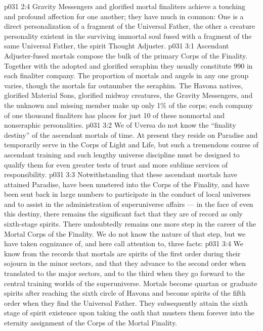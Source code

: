\vs p031 2:4 Gravity Messengers and glorified mortal finaliters achieve a touching and profound affection for one another; they have much in common: One is a direct personalization of a fragment of the Universal Father, the other a creature personality existent in the surviving immortal soul fused with a fragment of the same Universal Father, the spirit Thought Adjuster.
\vs p031 3:1 Ascendant Adjuster\hyp{}fused mortals compose the bulk of the primary Corps of the Finality. Together with the adopted and glorified seraphim they usually constitute 990 in each finaliter company. The proportion of mortals and angels in any one group varies, though the mortals far outnumber the seraphim. The Havona natives, glorified Material Sons, glorified midway creatures, the Gravity Messengers, and the unknown and missing member make up only 1\% of the corps; each company of one thousand finaliters has places for just 10 of these nonmortal and nonseraphic personalities.
\vs p031 3:2 We of Uversa do not know the “finality destiny” of the ascendant mortals of time. At present they reside on Paradise and temporarily serve in the Corps of Light and Life, but such a tremendous course of ascendant training and such lengthy universe discipline must be designed to qualify them for even greater tests of trust and more sublime services of responsibility.
\vs p031 3:3 \pc Notwithstanding that these ascendant mortals have attained Paradise, have been mustered into the Corps of the Finality, and have been sent back in large numbers to participate in the conduct of local universes and to assist in the administration of superuniverse affairs --- in the face of even this  destiny, there remains the significant fact that they are of record as only sixth\hyp{}stage spirits. There undoubtedly remains one more step in the career of the Mortal Corps of the Finality. We do not know the nature of that step, but we have taken cognizance of, and here call attention to, three facts:
\vs p031 3:4 \bibnobreakspace We know from the records that mortals are spirits of the first order during their sojourn in the minor sectors, and that they advance to the second order when translated to the major sectors, and to the third when they go forward to the central training worlds of the superuniverse. Mortals become quartan or graduate spirits after reaching the sixth circle of Havona and become spirits of the fifth order when they find the Universal Father. They subsequently attain the sixth stage of spirit existence upon taking the oath that musters them forever into the eternity assignment of the Corps of the Mortal Finality.
